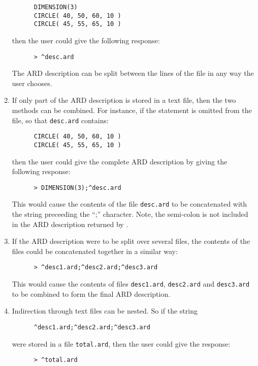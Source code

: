 \begin{enumerate}
\small
\begin{verbatim}
      DIMENSION(3)             
      CIRCLE( 40, 50, 60, 10 ) 
      CIRCLE( 45, 55, 65, 10 ) 
\end{verbatim}
\normalsize

then the user could give the following response:

\small
\begin{verbatim}
      > ^desc.ard
\end{verbatim}
\normalsize

The ARD description can be split between the lines of the file in any way the 
user chooses. 

\item If only part of the ARD description is stored in a text file, then the two
methods can be combined. For instance, if the  statement is omitted 
from the file, so that \verb+desc.ard+ contains: 

\small
\begin{verbatim}
      CIRCLE( 40, 50, 60, 10 ) 
      CIRCLE( 45, 55, 65, 10 ) 
\end{verbatim}
\normalsize

then the user could give the complete ARD description by giving the following 
response:

\small
\begin{verbatim}
      > DIMENSION(3);^desc.ard
\end{verbatim}
\normalsize

This would cause the contents of the file \verb+desc.ard+ to be concatenated with the 
string preceeding the ``;'' character. Note, the semi-colon is not included in 
the ARD description returned by .

\item If the ARD description were to be split over several files, the contents 
of the files could be concatenated together in a similar way:

\small
\begin{verbatim}
      > ^desc1.ard;^desc2.ard;^desc3.ard
\end{verbatim}
\normalsize

This would cause the contents of files \verb+desc1.ard+, \verb+desc2.ard+ and 
\verb+desc3.ard+ to be 
combined to form the final ARD description.

\item Indirection through text files can be nested. So if the string

\small
\begin{verbatim}
      ^desc1.ard;^desc2.ard;^desc3.ard
\end{verbatim}
\normalsize

were stored in a file \verb+total.ard+, then the user could give the response: 

\small
\begin{verbatim}
      > ^total.ard
\end{verbatim}
\normalsize

\end{enumerate}

